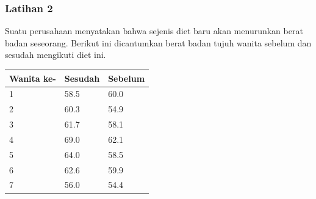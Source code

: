 \documentclass[a4paper,12pt]{article}
\begin{document}
\subsubsection{Latihan 2}
Suatu perusahaan menyatakan bahwa sejenis diet baru akan menurunkan berat badan seseorang. Berikut ini dicantumkan berat badan tujuh wanita sebelum dan sesudah mengikuti diet ini.
\begin{table}[!ht]
    \centering
\begin{tabular}{|l|l|l|}
\hline
Wanita ke- & Sesudah & Sebelum \\ \hline
1          & 58.5    & 60.0    \\ \hline
2          & 60.3    & 54.9    \\ \hline
3          & 61.7    & 58.1    \\ \hline
4          & 69.0    & 62.1    \\ \hline
5          & 64.0    & 58.5    \\ \hline
6          & 62.6    & 59.9    \\ \hline
7          & 56.0    & 54.4    \\ \hline
\end{tabular}
\end{table}
\end{document}
